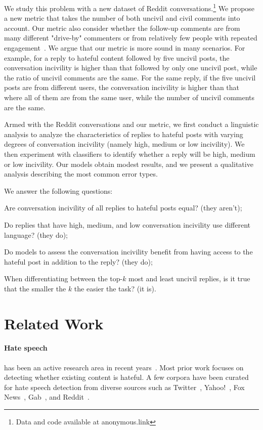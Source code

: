 \documentclass[11pt]{article}
\begin{document}
	We study this problem with a new dataset of Reddit conversations.\footnote{Data and code available at anonymous.link}
	We propose a new metric that takes the number of both uncivil and civil comments into account.
	Our metric also consider whether the follow-up comments are from many different "drive-by" commenters or from relatively few people with repeated engagement~\cite{10.1145/2433396.2433401}. 
	We argue that our metric is more sound in many scenarios.
	For example, for a reply to hateful content followed by five uncivil posts, the conversation incivility is higher than that followed by only one uncivil post,
	while the ratio of uncivil comments are the same.
	For the same reply, if the five uncivil posts are from different users, the conversation incivility is higher than that where all of them are from the same user,
	while the number of uncivil comments are the same.
	
	Armed with the Reddit conversations and our metric,
	we first conduct a linguistic analysis to analyze the characteristics of replies to hateful posts with varying degrees of conversation incivility (namely high, medium or low incivility).
	We then experiment with classifiers to identify whether a reply will be high, medium or low incivility.
	Our models obtain modest results,
	and we present a qualitative analysis describing the most common error types.
	
	We answer the following questions:
	\begin{compactenum}
		\item Are conversation incivility of all replies to hateful posts equal? (they aren't);
		\item Do replies that have high, medium, and low conversation incivility use different language? (they do);
		\item Do models to assess the conversation incivility benefit from having access to the hateful post in addition to the reply? (they do);
		\item When differentiating between the top-$k$ most and least uncivil replies,
		is it true that the smaller the $k$ the easier the task? (it is).
	\end{compactenum}
	
	
	\section{Related Work}
	\label{s:related_work}
	\paragraph{Hate speech}
	has been an active research area in recent years~\cite{fortuna2018survey}. 
	Most prior work focuses on detecting whether existing content is hateful.
	A few corpora have been curated for hate speech detection from diverse sources such as
	Twitter~\cite{waseem-hovy-2016-hateful, hateoffensive},
	Yahoo!~\cite{nobata2016abusive},
	Fox News~\cite{gao-huang-2017-detecting},
	Gab~\cite{DBLP:conf/aaai/MathewSYBG021},
	and Reddit~\cite{qian-etal-2019-benchmark}.
	
\end{document}
